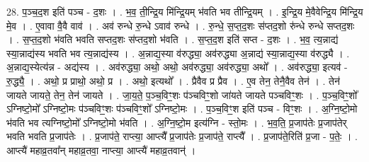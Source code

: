 \documentclass[17pt]{extarticle}
\begin{document}
28. प॒ञ्च॒द॒श इति॑ पञ्च - द॒शः । . भ॒व॒ ती॒न्द्रि॒य मि॑न्द्रि॒यम् भ॑वति भव तीन्द्रि॒यम् । . इ॒न्द्रि॒य मे॒वैवेन्द्रि॒य मि॑न्द्रि॒य मे॒व । . ए॒वावा वै॒वै वाव॑ । . अव॑ रुन्धे रु॒न्धे ऽवाव॑ रुन्धे । . रु॒न्धे॒ स॒प्त॒द॒शः स॑प्तद॒शो रु॑न्धे रुन्धे सप्तद॒शः । . स॒प्त॒द॒शो भ॑वति भवति सप्तद॒शः स॑प्तद॒शो भ॑वति । . स॒प्त॒द॒श इति॑ सप्त - द॒शः । . भ॒व॒ त्य॒न्नाद्य॑ स्या॒न्नाद्य॑स्य भवति भव त्य॒न्नाद्य॑स्य । . अ॒न्नाद्य॒स्या व॑रुद्ध्या॒ अव॑रुद्ध्या अ॒न्नाद्य॑ स्या॒न्नाद्य॒स्या व॑रुद्ध्यै । . अ॒न्नाद्य॒स्येत्य॑न्न - अद्य॑स्य । . अव॑रुद्ध्या॒ अथो॒ अथो॒ अव॑रुद्ध्या॒ अव॑रुद्ध्या॒ अथो᳚ । . अव॑रुद्ध्या॒ इत्यव॑ - रु॒द्ध्यै॒ । . अथो॒ प्र प्राथो॒ अथो॒ प्र । . अथो॒ इत्यथो᳚ । . प्रैवैव प्र प्रैव । . ए॒व तेन॒ तेनै॒वैव तेन॑ । . तेन॑ जायते जायते॒ तेन॒ तेन॑ जायते । . जा॒य॒ते॒ प॒ञ्च॒विꣳ॒॒शः प॑ञ्चविꣳ॒॒शो जा॑यते जायते पञ्चविꣳ॒॒शः । . प॒ञ्च॒विꣳ॒॒शो᳚ ऽग्निष्टो॒मो᳚ ऽग्निष्टो॒मः प॑ञ्चविꣳ॒॒शः प॑ञ्चविꣳ॒॒शो᳚ ऽग्निष्टो॒मः । . प॒ञ्च॒विꣳ॒॒श इति॑ पञ्च - विꣳ॒॒शः । . अ॒ग्नि॒ष्टो॒मो भ॑वति भव त्यग्निष्टो॒मो᳚ ऽग्निष्टो॒मो भ॑वति । . अ॒ग्नि॒ष्टो॒म इत्य॑ग्नि - स्तो॒मः । . भ॒व॒ति॒ प्र॒जाप॑तेः प्र॒जाप॑तेर् भवति भवति प्र॒जाप॑तेः । . प्र॒जाप॑ते॒ राप्त्या॒ आप्त्यै᳚ प्र॒जाप॑तेः प्र॒जाप॑ते॒ राप्त्यै᳚ । . प्र॒जाप॑ते॒रिति॑ प्र॒जा - प॒तेः॒ । . आप्त्यै॑ महाव्र॒तवा᳚न् महाव्र॒तवा॒ नाप्त्या॒ आप्त्यै॑ महाव्र॒तवान्॑ । \newline
\end{document}
